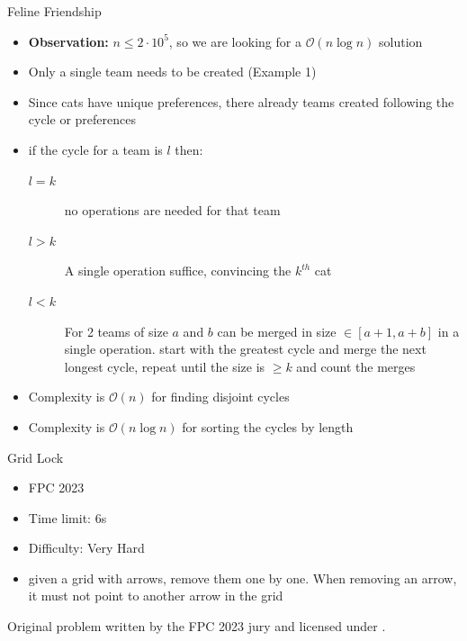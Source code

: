 \documentclass[11pt,pdf, aspectratio=169]{beamer}
\begin{document}
  \begin{frame}{Feline Friendship}
    \begin{itemize}
      \item<1-> \textbf{Observation:} $n \leq 2\cdot 10^5$, so we are looking for a $\mathcal{O}(n \log n)$ solution
      \item<2-> Only a single team needs to be created (Example 1)
      \item<2-> Since cats have unique preferences, there already teams created following the cycle or preferences
      \item<3-> if the cycle for a team is $l$ then:\begin{description}
                                                      \item[$l = k$] no operations are needed for that team
                                                      \item[$l > k$] A single operation suffice, convincing the $k^{th}$ cat
                                                      \item[$l < k$] For 2 teams of size $a$ and $b$ can be merged in size $\in [a+1, a+b]$ in a single operation.
                                                      start with the greatest cycle and merge the next longest cycle, repeat until the size is $\geq k$ and count the merges
      \end{description}
      \item<4-> Complexity is $\mathcal{O}(n)$ for finding disjoint cycles
      \item<4-> Complexity is $\mathcal{O}(n \log n )$ for sorting the cycles by length
    \end{itemize}
  \end{frame}
  \begin{frame}{Grid Lock}
    \begin{itemize}
      \item FPC 2023
      \item Time limit: 6s
      \item Difficulty: Very Hard
      \item given a grid with arrows, remove them one by one.
      When removing an arrow, it must not point to another arrow in the grid
    \end{itemize}
    Original problem written by the FPC 2023 jury and licensed under \doclicenseLongNameRef.

    \doclicenseImage

  \end{frame}
\end{document}
